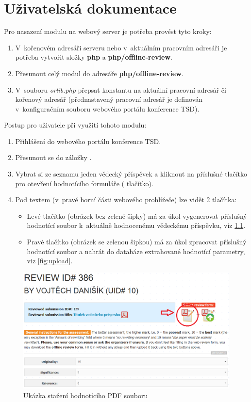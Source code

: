 \chapter{Uživatelská dokumentace}
Pro nasazení modulu na webový server je potřeba provést tyto kroky:
\begin{enumerate}
	\item V~kořenovém adresáři serveru nebo v~aktuálním pracovním adresáři je potřeba vytvořit složky \textbf{php} a \textbf{php/offline-review}.
	\item Přesunout celý modul do adresáře \textbf{php/offline-review}.
	\item V~souboru \textit{orlib.php} přepsat konstantu  na aktuální pracovní adresář či kořenový adresář (přednastavený pracovní adresář je definován v~konfiguračním souboru webového portálu konference TSD).
\end{enumerate}


Postup pro uživatele při využití tohoto modulu:
\begin{enumerate}
	\item Přihlášení do webového portálu konference TSD.
	\item Přesunout se do záložky .
	\item Vybrat si ze seznamu jeden vědecký příspěvek a kliknout na příslušné tlačítko pro otevření hodnotícího formuláře ( tlačítko).
	\item Pod textem  (v~pravé horní části webového prohlížeče) lze vidět 2 tlačítka:
	\begin{itemize}
		\item Levé tlačítko (obrázek bez zelené šipky) má za úkol vygenerovat příslušný hodnotící soubor k~aktuálně hodnocenému vědeckému příspěvku, viz \ref{fig:download}.
		\item Pravé tlačítko (obrázek se zelenou šipkou) má za úkol zpracovat příslušný hodnotící soubor a nahrát do databáze extrahované hodnotící parametry, viz \ref{fig:upload}.
	\end{itemize}
\end{enumerate}

\begin{figure}[h!]
\centering
\includegraphics[width=12cm]{img/download}
\caption{Ukázka stažení hodnotícího PDF souboru}
\label{fig:download}
\end{figure}

